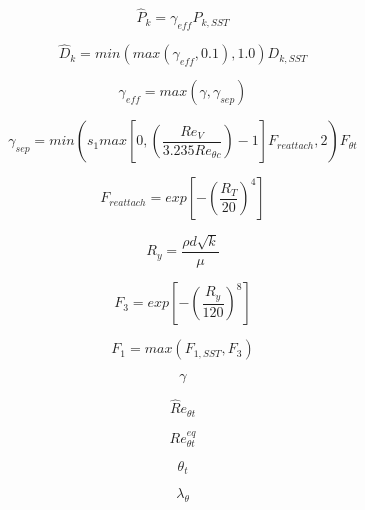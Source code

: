 \documentclass[8pt]{article}
\begin{document}
\begin{equation}
    \hat P_k = \gamma_{eff} P_{k,SST}
\end{equation}

\begin{equation}
    \hat D_k = min \left( max \left( \gamma_{eff},0.1 \right), 1.0 \right) D_{k,SST}
\end{equation}

\begin{equation}
    \gamma_{eff} = max \left( \gamma, \gamma_{sep} \right)
\end{equation}

\begin{equation}
    \gamma_{sep} = min \left( s_1 max \left[0, \left( \frac{Re_V}{3.235 Re_{\theta c}} \right) - 1 \right] F_{reattach},2 \right) F_{\theta t}
\end{equation}

\begin{equation}
    F_{reattach} = exp \left[ - \left( \frac{R_T}{20} \right) ^4 \right]
\end{equation}

\begin{equation}
    R_y = \frac{\rho d \sqrt{k}}{\mu}
\end{equation}

\begin{equation}
    F_3 = exp \left[ - \left( \frac{R_y}{120} \right)^8 \right]
\end{equation}

\begin{equation}
    F_1 = max \left( F_{1,SST},F_3 \right)
\end{equation}

\begin{equation}
   \gamma
\end{equation}

\begin{equation}
   \hat Re_{\theta t}
\end{equation}

\begin{equation}
   Re_{\theta t} ^{eq}
\end{equation}

\begin{equation}
   \theta_t
\end{equation}

\begin{equation}
   \lambda_{\theta}
\end{equation}
\end{document}
